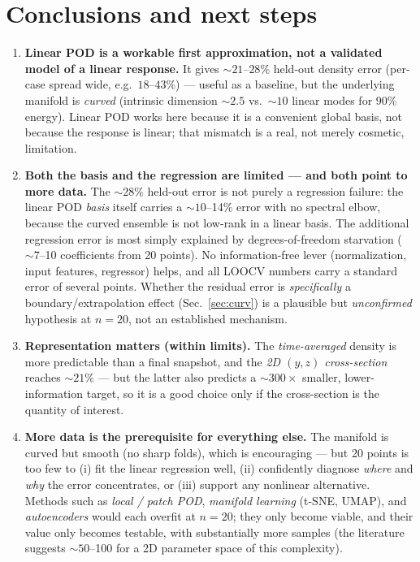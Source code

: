 \documentclass[11pt]{article}
\begin{document}
\section{Conclusions and next steps}
\begin{enumerate}
\item \textbf{Linear POD is a workable first approximation, not a validated
model of a linear response.} It gives ${\sim}21$--$28\%$ held-out density
error (per-case spread wide, e.g.\ $18$--$43\%$) --- useful as a baseline,
but the underlying manifold is \emph{curved} (intrinsic dimension
${\sim}2.5$ vs.\ ${\sim}10$ linear modes for 90\% energy). Linear POD works
here because it is a convenient global basis, not because the response is
linear; that mismatch is a real, not merely cosmetic, limitation.
\item \textbf{Both the basis and the regression are limited --- and both
point to more data.} The ${\sim}28\%$ held-out error is not purely a
regression failure: the linear POD \emph{basis} itself carries a
${\sim}10$--14\% error with no spectral elbow, because the curved ensemble
is not low-rank in a linear basis. The additional regression error is most
simply explained by degrees-of-freedom starvation (${\sim}7$--10
coefficients from 20 points). No information-free lever (normalization,
input features, regressor) helps, and all LOOCV numbers carry a standard
error of several points. Whether the residual error is \emph{specifically}
a boundary/extrapolation effect (Sec.~\ref{sec:curv}) is a plausible but
\emph{unconfirmed} hypothesis at $n{=}20$, not an established mechanism.
\item \textbf{Representation matters (within limits).} The
\emph{time-averaged} density is more predictable than a final snapshot, and
the \emph{2D $(y,z)$ cross-section} reaches ${\sim}21\%$ --- but the latter
also predicts a ${\sim}300\times$ smaller, lower-information target, so it
is a good choice only if the cross-section is the quantity of interest.
\item \textbf{More data is the prerequisite for everything else.} The
manifold is curved but smooth (no sharp folds), which is encouraging ---
but 20 points is too few to (i) fit the linear regression well, (ii)
confidently diagnose \emph{where} and \emph{why} the error concentrates, or
(iii) support any nonlinear alternative. Methods such as \emph{local /
patch POD}, \emph{manifold learning} (t-SNE, UMAP), and \emph{autoencoders}
would each overfit at $n{=}20$; they only become viable, and their value
only becomes testable, with substantially more samples (the literature
suggests ${\sim}50$--100 for a 2D parameter space of this complexity).
\end{enumerate}
\end{document}
